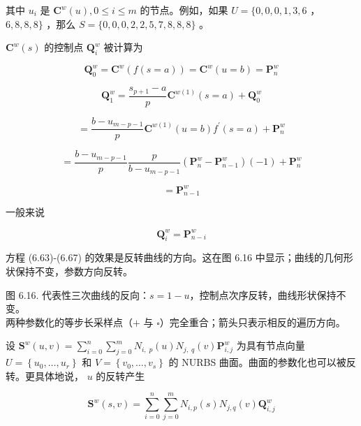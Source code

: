 \documentclass[../main.tex]{subfiles}
\begin{document}
其中 \({u}_{i}\) 是 \({\mathbf{C}}^{w}\left( u\right) ,0 \leq  i \leq  m\) 的节点。例如，如果 \(U = \{ 0,0,0,1,3,6\) ， \(6,8,8,8\}\) ，那么 \(S = \{ 0,0,0,2,2,5,7,8,8,8\}\) 。

\({\mathbf{C}}^{w}\left( s\right)\) 的控制点 \({\mathbf{Q}}_{i}^{w}\) 被计算为

\[
{\mathbf{Q}}_{0}^{w} = {\mathbf{C}}^{w}\left( {f\left( {s = a}\right) }\right)  = {\mathbf{C}}^{w}\left( {u = b}\right)  = {\mathbf{P}}_{n}^{w}
\]

\[
{\mathbf{Q}}_{1}^{w} = \frac{{s}_{p + 1} - a}{p}{\mathbf{C}}^{w\left( 1\right) }\left( {s = a}\right)  + {\mathbf{Q}}_{0}^{w}
\]

\[
= \frac{b - {u}_{m - p - 1}}{p}{\mathbf{C}}^{w\left( 1\right) }\left( {u = b}\right) {f}^{\prime }\left( {s = a}\right)  + {\mathbf{P}}_{n}^{w}
\]

\[
= \frac{b - {u}_{m - p - 1}}{p}\frac{p}{b - {u}_{m - p - 1}}\left( {{\mathbf{P}}_{n}^{w} - {\mathbf{P}}_{n - 1}^{w}}\right) \left( {-1}\right)  + {\mathbf{P}}_{n}^{w}
\]

\[
= {\mathbf{P}}_{n - 1}^{w}
\]

一般来说

\[
{\mathbf{Q}}_{i}^{w} = {\mathbf{P}}_{n - i}^{w} \tag{6.67}
\]

方程 (6.63)-(6.67) 的效果是反转曲线的方向。这在图 6.16 中显示；曲线的几何形状保持不变，参数方向反转。

\begin{center}
\begin{minipage}{17cm}
\vspace*{.6\baselineskip}
\centering
{}
\par\smallskip
图 6.16. 代表性三次曲线的反向：$s=1-u$，控制点次序反转，曲线形状保持不变。\\
两种参数化的等步长采样点（$+$ 与 $\square$）完全重合；箭头只表示相反的遍历方向。
\end{minipage}
\end{center}

设 \({\textbf{S}}^{w}\left( {u,v}\right)  = \mathop{\sum }\limits_{{i = 0}}^{n}\mathop{\sum }\limits_{{j = 0}}^{m}{N}_{i,\;p}\left( u\right) {N}_{j,\;q}\left( v\right) {\textbf{P}}_{i,j}^{w}\) 为具有节点向量 \(U = \left\{  {{u}_{0},\ldots ,{u}_{r}}\right\}\) 和 \(V = \left\{  {{v}_{0},\ldots ,{v}_{s}}\right\}\) 的 NURBS 曲面。曲面的参数化也可以被反转。更具体地说， \(u\) 的反转产生

\[
{\mathbf{S}}^{w}\left( {s,v}\right)  = \mathop{\sum }\limits_{{i = 0}}^{n}\mathop{\sum }\limits_{{j = 0}}^{m}{N}_{i,p}\left( s\right) {N}_{j,q}\left( v\right) {\mathbf{Q}}_{i,j}^{w} \tag{6.68}
\]
\end{document}
